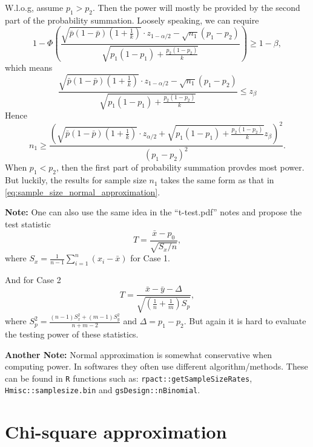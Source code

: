 \documentclass[a4paper,12pt]{article}
\begin{document}
W.l.o.g, assume $p_1 > p_2$. Then the power will mostly be provided by the second part of the probability summation. Loosely speaking, we can require
\[
  1 -
  \Phi\left(
    \frac{
      \sqrt{\bar{p}\left(1 - \bar{p}\right)\left(1 + \frac{1}{k}\right)}
      \cdot z_{1 - \alpha / 2}
      -\sqrt{n_1}\left(p_1 - p_2\right)
    }{
      \sqrt{
        p_1\left(1 - p_1\right)
        + \frac{p_2\left(1 - p_2\right)}{k}
      }
    }
  \right)
  \geq 1 - \beta
  ,
\]
which means
\[
  \frac{
    \sqrt{\bar{p}\left(1 - \bar{p}\right)\left(1 + \frac{1}{k}\right)}
    \cdot z_{1 - \alpha / 2}
    -\sqrt{n_1}\left(p_1 - p_2\right)
  }{
    \sqrt{
      p_1\left(1 - p_1\right)
      + \frac{p_2\left(1 - p_2\right)}{k}
    }
  }
  \leq z_{\beta}
\]
Hence
\begin{equation}
  \label{eq:sample_size_normal_approximation}
    n_1 \geq \frac{\left(
      \sqrt{\bar{p}\left(1 - \bar{p}\right)\left(1 + \frac{1}{k}\right)}
      \cdot z_{\alpha / 2}
      + \sqrt{
      p_1\left(1 - p_1\right)
      + \frac{p_2\left(1 - p_2\right)}{k}
    }
    z_{\beta}
    \right)^2
  }{\left(p_1 - p_2\right)^2}
  .
\end{equation}
When $p_1 < p_2$, then the first part of probability summation provdes most power. But luckily, the results for sample size $n_1$ takes the same form as that in \eqref{eq:sample_size_normal_approximation}.
\par
\textbf{Note: } One can also use the same idea in the ``t-test.pdf'' notes and propose the test statistic
\[
  T = \frac{\bar{x} - p_0}{\sqrt{S_x / n}}
  ,
\]
where $S_x = \frac{1}{n - 1}\sum\limits_{i = 1}^n\left(x_i - \bar{x}\right)$ for Case 1.
\par
And for Case 2
\[
  T = \frac{\bar{x} - \bar{y} - \Delta}{\sqrt{
      \left(\frac{1}{n} + \frac{1}{m}\right)S_p
    }}
  ,
\]
where $S_p^2 = \frac{\left(n - 1\right)S_x^2 + \left(m - 1\right)S_y^2}{n + m - 2}$ and $\Delta = p_1 - p_2$. But again it is hard to evaluate the testing power of these statistics.
\par
\textbf{Another Note: } Normal approximation is somewhat conservative when computing power. In softwares they often use different algorithm/methods. These can be found in \texttt{R} functions such as: \texttt{rpact::getSampleSizeRates}, \texttt{Hmisc::samplesize.bin} and \texttt{gsDesign::nBinomial}.


\section{Chi-square approximation}
\label{sec:chi-square-appr}
\end{document}
